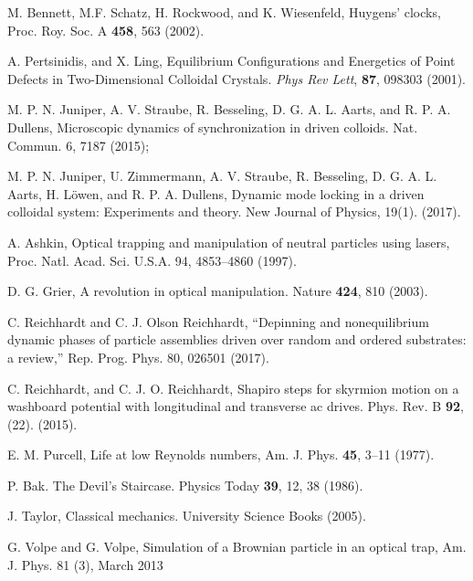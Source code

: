 \documentclass[twocolumn,preprintnumbers,amsmath,amssymb,aps,prb]{revtex4}
\begin{document}
\begin{thebibliography}{99}
   M. Bennett, M.F. Schatz, H. Rockwood, and K. Wiesenfeld, Huygens' clocks, Proc. Roy. Soc. A {\bf 458}, 563 (2002).

    
   A. Pertsinidis, and X. Ling,  Equilibrium Configurations and Energetics of Point Defects in Two-Dimensional Colloidal Crystals. {\it Phys Rev Lett}, {\bf 87}, 098303 (2001). %

   M. P. N. Juniper, A. V. Straube, R. Besseling, D. G. A. L. Aarts, and R. P. A. Dullens, Microscopic dynamics of synchronization in driven colloids. Nat. Commun. 6, 7187 (2015); 
      
   M. P. N. Juniper,  U. Zimmermann, A. V. Straube, R. Besseling, D. G. A. L. Aarts, H. L{\"o}wen, and R. P. A. Dullens,  Dynamic mode locking in a driven colloidal system: Experiments and theory. New Journal of Physics, 19(1). (2017).  %

   A. Ashkin, Optical trapping and manipulation of neutral particles using lasers, Proc. Natl. Acad. Sci. U.S.A. 94, 4853–4860 (1997).

   D. G. Grier, A revolution in optical manipulation. Nature {\bf 424}, 810 (2003).

   C. Reichhardt and C. J. Olson Reichhardt, “Depinning and nonequilibrium dynamic phases of particle assemblies driven over random and ordered substrates: a review,” Rep. Prog. Phys. 80, 026501 (2017).

   C. Reichhardt, and C. J. O. Reichhardt,  Shapiro steps for skyrmion motion on a washboard potential with longitudinal and transverse ac drives. Phys. Rev. B {\bf 92}, (22). (2015).      

   E. M. Purcell, Life at low Reynolds numbers, Am. J. Phys. {\bf 45}, 3–11 (1977).
  
   P. Bak. The Devil's Staircase. Physics Today {\bf 39}, 12, 38 (1986).

   J. Taylor,  Classical mechanics. University Science Books (2005).

   G. Volpe and G. Volpe, Simulation of a Brownian particle in an optical trap, Am. J. Phys. 81 (3), March 2013


\end{thebibliography}
\end{document}
